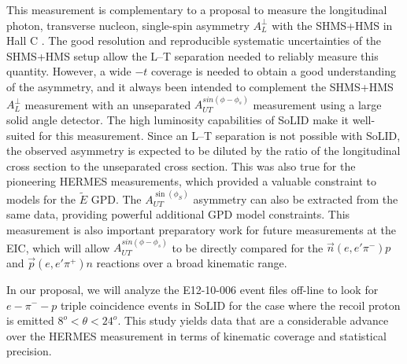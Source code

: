 \documentclass{article}
\begin{document}
This measurement is complementary to a proposal to measure the longitudinal
photon, transverse nucleon, single-spin asymmetry $A_L^{\perp}$ with the
SHMS+HMS in Hall C \cite{atpi39}.  The good resolution and reproducible
systematic uncertainties of the SHMS+HMS setup allow the L--T separation needed
to reliably measure this quantity.  However, a wide $-t$ coverage is needed to
obtain a good understanding of the asymmetry, and it always been intended to
complement the SHMS+HMS $A_L^{\perp}$ measurement with an unseparated
$A_{UT}^{sin(\phi-\phi_s)}$ measurement using a large solid angle detector.
The high luminosity capabilities of SoLID make it well-suited for this
measurement.  Since an L--T separation is not possible with SoLID, the observed
asymmetry is expected to be diluted by the ratio of the longitudinal cross
section to the unseparated cross section.  This was also true for the
pioneering HERMES measurements, which provided a valuable constraint to models
for the $\tilde{E}$ GPD.  The $A_{UT}^{\sin(\phi_S)}$ asymmetry can also be
extracted from the same data, providing powerful additional GPD model
constraints.  This measurement is also important preparatory work for future
measurements at the EIC, which will allow $A_{UT}^{sin(\phi-\phi_s)}$ to be
directly compared for the $\vec{n}(e,e'\pi^-)p$ and $\vec{p}(e,e'\pi^+)n$
reactions over a broad kinematic range.


In our proposal, we will analyze the E12-10-006 event files
off-line to look for $e-\pi^--p$ triple coincidence events in SoLID for the
case where the recoil proton is emitted $8^o<\theta<24^o$.  This study yields
data that are a considerable advance over the HERMES measurement in terms of
kinematic coverage and statistical precision. 


\newpage
\appendix

%

\end{document}
